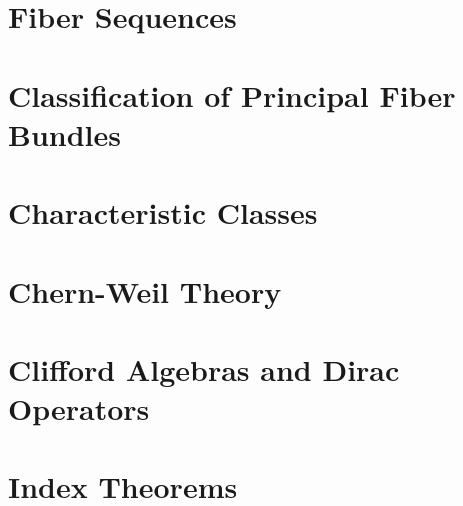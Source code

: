 \chapter{Fiber Sequences}


\chapter{Classification of Principal Fiber Bundles}

\chapter{Characteristic Classes}

\chapter{Chern-Weil Theory}
\chapter{Clifford Algebras and Dirac Operators}
\chapter{Index Theorems}
